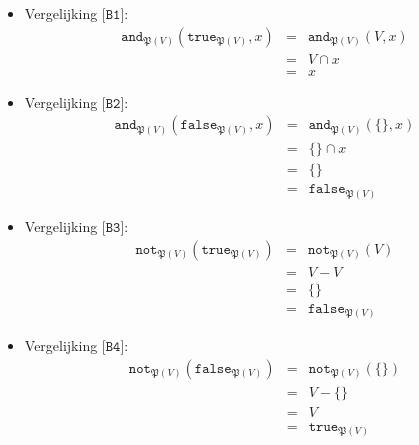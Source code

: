 \documentclass[a4paper,11pt]{article}
\begin{document}
\begin{itemize}

\item{Vergelijking $\texttt{[B1]}$:}
\begin{eqnarray*}
\texttt{and}_{\mathfrak{P}(V)}(\texttt{true}_{\mathfrak{P}(V)},x) & = & \texttt{and}_{\mathfrak{P}(V)}(V,x) \\
                                                                  & = & V \cap x \\
                                                                  & = & x
\end{eqnarray*}

\item{Vergelijking $\texttt{[B2]}$:}
\begin{eqnarray*}
\texttt{and}_{\mathfrak{P}(V)}(\texttt{false}_{\mathfrak{P}(V)},x) & = & \texttt{and}_{\mathfrak{P}(V)}(\{\},x) \\
                                                                   & = & \{\} \cap x \\
                                                                   & = & \{\} \\
                                                                   & = & \texttt{false}_{\mathfrak{P}(V)}
\end{eqnarray*}

\item{Vergelijking $\texttt{[B3]}$:}
\begin{eqnarray*}
\texttt{not}_{\mathfrak{P}(V)}(\texttt{true}_{\mathfrak{P}(V)}) & = & \texttt{not}_{\mathfrak{P}(V)}(V) \\
                                                                & = & V - V \\
                                                                & = & \{\} \\
                                                                & = & \texttt{false}_{\mathfrak{P}(V)}
\end{eqnarray*}

\item{Vergelijking $\texttt{[B4]}$:}
\begin{eqnarray*}
\texttt{not}_{\mathfrak{P}(V)}(\texttt{false}_{\mathfrak{P}(V)}) & = & \texttt{not}_{\mathfrak{P}(V)}(\{\}) \\
                                                                 & = & V - \{\} \\
                                                                 & = & V \\
                                                                 & = & \texttt{true}_{\mathfrak{P}(V)}
\end{eqnarray*}


\end{itemize}
\end{document}
